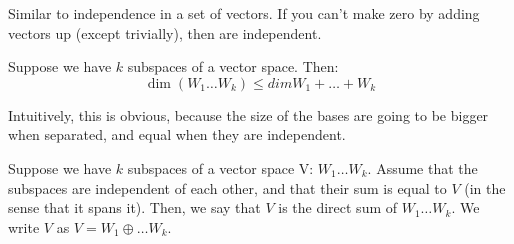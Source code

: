 \begin{definition}

  Similar to independence in a set of vectors. If you can't make zero by adding
  vectors up (except trivially), then are independent.

\end{definition}

\begin{definition}

  Suppose we have $k$ subspaces of a vector space. Then:
  \[\dim (W_{1}\ldots W_{k}) \leq dim W_{1} + \ldots + W_{k}\]

  Intuitively, this is obvious, because the size of the bases are going to be
  bigger when separated, and equal when they are independent.

\end{definition}

\begin{definition}

  Suppose we have $k$ subspaces of a vector space V: $W_{1}\ldots W_{k}$. Assume
that the subspaces are independent of each other, and that their sum is equal to
$V$ (in the sense that it spans it). Then, we say that $V$ is the direct sum of
$W_{1}\ldots W_{k}$. We write $V$ as $V=W_{1}\oplus \ldots W_{k}$.

\end{definition}
